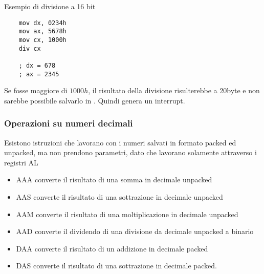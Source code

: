 \documentclass[../template]{subfiles}
\begin{document}
\vspace{10pt}
\noindent
Esempio di divisione a 16 bit
\begin{lstlisting}
    mov dx, 0234h
    mov ax, 5678h
    mov cx, 1000h
    div cx

    ; dx = 678
    ; ax = 2345
\end{lstlisting}
Se \dx fosse maggiore di $1000h$, il risultato della divisione risulterebbe a 20byte e non sarebbe possibile salvarlo in \ax. Quindi
genera un interrupt.

\subsubsection{Operazioni su numeri decimali}
Esistono istruzioni che lavorano con i numeri salvati in formato packed ed unpacked, ma non prendono parametri, dato che
lavorano solamente attraverso i registri AL

\begin{itemize}
    \item AAA converte il risultato di una somma in decimale unpacked
    \item AAS converte il risultato di una sottrazione in decimale unpacked
    \item AAM converte il risultato di una moltiplicazione in decimale unpacked
    \item AAD converte il dividendo di una divisione da decimale unpacked a binario
    \item DAA converte il risultato di un addizione in decimale packed
    \item DAS converte il risultato di una sottrazione in decimale packed.
\end{itemize}
\end{document}
